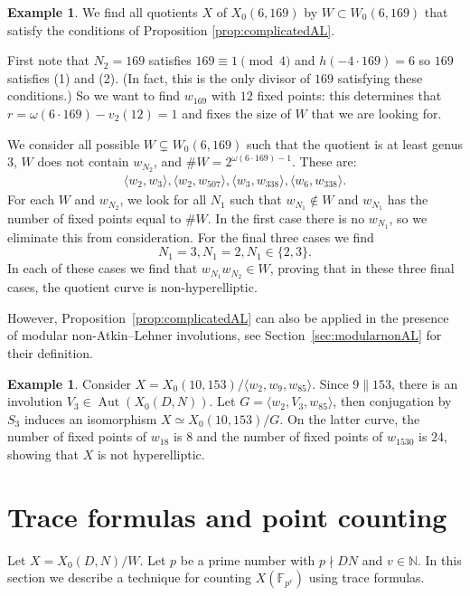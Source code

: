 \documentclass[12pt]{amsart}
\newcommand{\F}{\mathbb{F}}
\newcommand{\N}{\mathbb{N}}
\DeclareMathOperator{\Aut}{Aut}
\numberwithin{equation}{subsection}
\theoremstyle{plain}\newtheorem{ithm}{Theorem}
\theoremstyle{plain}\newtheorem{iprop}[ithm]{Proposition}
\theoremstyle{definition}
\newtheorem{example}[equation]{Example}
\theoremstyle{remark}
\newcommand{\Curve}[2]{X_0({#1},{#2})} %
\newcommand{\ALfull}[2]{W_0({#1},{#2})} %
\begin{document}
\begin{example}
We find all quotients $X$ of $\Curve{6}{169}$ by $W \subset \ALfull{6}{169}$ that satisfy the conditions of Proposition \ref{prop:complicatedAL}.

First note that $N_2 = 169$ satisfies  $169 \equiv 1 \pmod 4 $ and $h(-4 \cdot 169) = 6$ so $169$ satisfies (1) and (2). (In fact, this is the only divisor of $169$ satisfying these conditions.)
So we want to find $w_{169}$ with $12$ fixed points: this determines that $r = \omega(6 \cdot 169) - v_2(12) = 1$ and fixes the size of $W$ that we are looking for.

We consider all possible $W \subsetneq \ALfull{6}{169}$ such that the quotient is at least genus $3$,  $W$ does not contain $w_{N_2}$, and $\# W = 2^{\omega(6 \cdot 169) - 1}$. These are:
\begin{align*}
\langle w_2, w_3 \rangle,
\langle w_2, w_{507} \rangle, 
\langle w_3, w_{338} \rangle,
\langle w_6, w_{338} \rangle.
\end{align*}
For each $W$ and $w_{N_2}$, we look for all $N_1$ such that $w_{N_1} \notin W$ and $w_{N_1}$ has the number of fixed points equal to $\# W$. 
In the first case there is no $w_{N_1}$, so we eliminate this from consideration.
For the final three cases we find
\[ N_1 = 3, N_1 = 2,  N_1 \in \{2,3\}.\]
In each of these cases we find that $w_{N_1} w_{N_2} \in W$,
proving that in these three final cases, the quotient curve is non-hyperelliptic.
\end{example}

However, Proposition~\ref{prop:complicatedAL} can also be applied in the presence of modular non-Atkin--Lehner involutions, see Section~\ref{sec:modularnonAL} for their definition.

\begin{example}
    Consider $X = \Curve{10}{153} / \langle w_2, w_9, w_{85} \rangle$. Since $9 \parallel 153$, there is an involution $V_3 \in \Aut(\Curve{D}{N})$. Let $G = \langle w_2 , V_3, w_{85} \rangle$, then conjugation by $S_3$ induces an isomorphism $X \simeq \Curve{10}{153} / G$. On the latter curve, the number of fixed points of $w_{18}$ is $8$ and the number of fixed points of $w_{1530}$ is $24$, showing that $X$ is not hyperelliptic. 
\end{example}

\section{Trace formulas and point counting}
\label{sec:trace}
Let $X = \Curve{D}{N}/W$. 
Let $p$ be a prime number with $p \nmid DN$ and $v \in \N$. 
In this section we describe a technique for counting $X(\F_{p^v})$ using trace formulas. 
\end{document}
